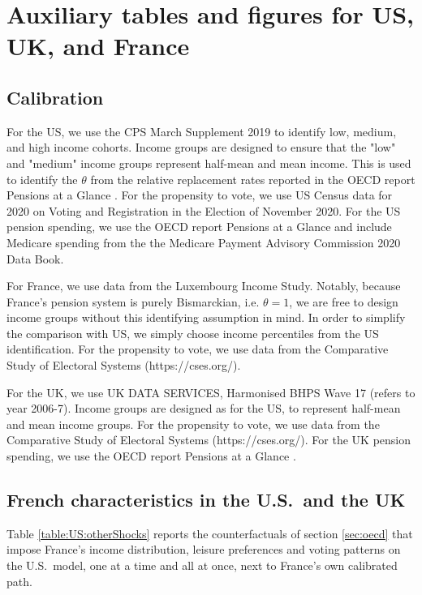 \section{Auxiliary tables and figures for US, UK, and France}\label{app:US}\setcounter{equation}{0}
\subsection{Calibration}
For the US, we use the CPS March Supplement 2019 to identify low, medium, and high income cohorts. Income groups are designed to ensure that the "low" and "medium" income groups represent half-mean and mean income. This is used to identify the $\theta$ from the relative replacement rates reported in the OECD report Pensions at a Glance \parencite{OECDpen}. For the propensity to vote, we use US Census data for 2020 on Voting and Registration in the Election of November 2020. For the US pension spending, we use the OECD report Pensions at a Glance \parencite{OECDpen} and include Medicare spending from the the Medicare Payment Advisory Commission 2020 Data Book. 



For France, we use data from the Luxembourg Income Study. Notably, because France's pension system is purely Bismarckian, i.e. $\theta = 1$, we are free to design income groups without this identifying assumption in mind. In order to simplify the comparison with US, we simply choose income percentiles from the US identification. For the propensity to vote, we use data from the Comparative Study of Electoral Systems (https://cses.org/).



For the UK, we use UK DATA SERVICES, Harmonised BHPS Wave 17 (refers to year 2006-7). Income groups are designed as for the US, to represent half-mean and mean income groups. For the propensity to vote, we use data from the Comparative Study of Electoral Systems (https://cses.org/). For the UK pension spending, we use the OECD report Pensions at a Glance \parencite{OECDpen}.



\subsection{French characteristics in the U.S.\ and the UK}\label{app:US:french}

Table \ref{table:US:otherShocks} reports the counterfactuals of section \ref{sec:oecd} that impose France's income distribution, leisure preferences and voting patterns on the U.S.\ model, one at a time and all at once, next to France's own calibrated path.

